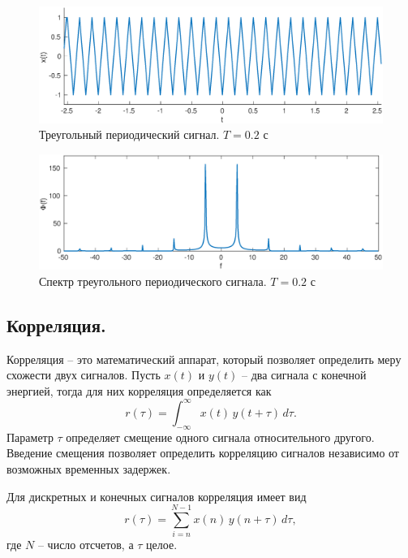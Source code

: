 \documentclass[a4paper,14pt]{extarticle}
\begin{document}
\begin{figure}[H]
\includegraphics[width=1\textwidth]{trg_x.eps}
\caption{Треугольный периодический сигнал. $T = 0.2$ с}
\label{trg_x}
\end{figure}

\begin{figure}[H]
\includegraphics[width=1\textwidth]{trg_s.eps}
\caption{Спектр треугольного периодического сигнала. $T = 0.2$ с}
\label{trg_s}
\end{figure}

\subsection{Корреляция.}

Корреляция -- это математический аппарат, который позволяет определить меру схожести двух сигналов. 
Пусть $x(t)$ и $y(t)$ -- два сигнала с конечной энергией, тогда для них корреляция определяется как 
\begin{equation*}
r(\tau) = \int_{-\infty}^{\infty} x(t)\,y(t+\tau)\,d\tau.
\end{equation*} 
Параметр $\tau$ определяет смещение одного сигнала относительного другого. Введение смещения позволяет определить корреляцию сигналов независимо от возможных временных задержек.

Для дискретных и конечных сигналов корреляция имеет вид 
\begin{equation*}
r(\tau) = \sum_{i=n}^{N-1} x(n)\,y(n+\tau)\,d\tau,
\end{equation*} 
где $N$ -- число отсчетов, а $\tau$ целое.
\end{document}

